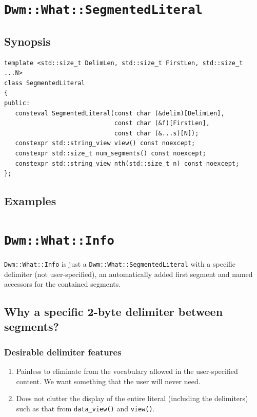 \documentclass[letterpaper,openany]{book}
\begin{document}


\begingroup
\renewcommand{\baselinestretch}{1.0}
\endgroup

\chapter{\texttt{Dwm::What::SegmentedLiteral}}

\section{Synopsis}

\begin{verbatim}
template <std::size_t DelimLen, std::size_t FirstLen, std::size_t ...N>
class SegmentedLiteral
{
public:
   consteval SegmentedLiteral(const char (&delim)[DelimLen],
                              const char (&f)[FirstLen],
                              const char (&...s)[N]);
   constexpr std::string_view view() const noexcept;
   constexpr std::size_t num_segments() const noexcept;      
   constexpr std::string_view nth(std::size_t n) const noexcept;
};
\end{verbatim}

\section{Examples}





\chapter{\texttt{Dwm::What::Info}}
\texttt{Dwm::What::Info} is just a \texttt{Dwm::What::SegmentedLiteral}
with a specific delimiter (not user-specified), an automatically added
first segment and named accessors for the contained segments.

\section{Why a specific 2-byte delimiter between segments?}
\subsection{Desirable delimiter features}
\begin{enumerate}
\item Painless to eliminate from the vocabulary allowed in
the user-specified content.  We want something that the user
will never need.
\item Does not clutter the display of the entire literal
(including the delimiters) such as that from \texttt{data\_view()}
and \texttt{view()}.
\end{enumerate}
\end{document}
